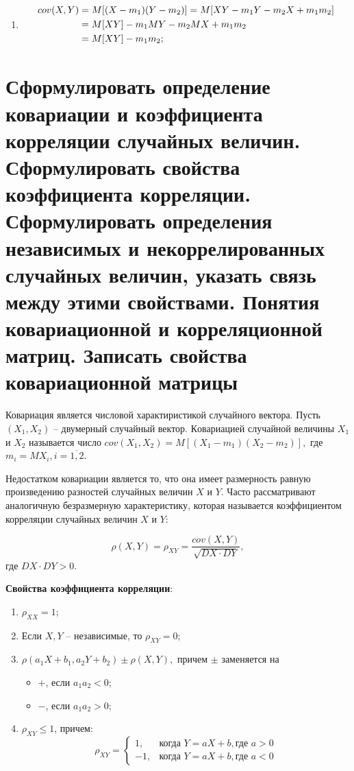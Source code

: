 \begin{enumerate}
	\item
	\begin{align}
		cov(X, Y) &=  M[(X - m_1)(Y-m_2)] = M[XY - m_1Y - m_2X + m_1m_2] \notag \\
		&= M[XY] - m_1MY - m_2MX + m_1m_2 \notag \\
		&= M[XY] - m_1m_2 \notag;
	\end{align}
	
\end{enumerate}

\section{Сформулировать определение ковариации и коэффициента корреляции случайных величин. Сформулировать свойства коэффициента корреляции. Сформулировать определения независимых и некоррелированных случайных величин, указать связь между этими свойствами. Понятия ковариационной и корреляционной матриц. Записать свойства ковариационной матрицы}

Ковариация является числовой характиристикой случайного вектора. Пусть $(X_1, X_2)$ -- двумерный случайный вектор. $Ковариацией$ случайной величины $X_1$ и $X_2$ называется число $cov(X_1, X_2) = M[(X_1 - m_1)(X_2 - m_2)],$ где $m_i = MX_i, i = \overline{1, 2}$.

Недостатком ковариации является то, что она имеет размерность равную произведению разностей случайных величин $X$ и $Y$. Часто рассматривают аналогичную безразмерную характеристику, которая называется коэффициентом корреляции случайных величин $X$ и $Y$:

\[
\rho(X, Y) = \rho_{XY} = \frac{cov(X, Y)}{\sqrt{DX \cdot DY}},
\] 
где $DX \cdot DY > 0$.

\textbf{Свойства коэффициента корреляции}:
\begin{enumerate}
	\item $\rho_{XX} = 1$;
	\item Если $X, Y$ -- независимые, то $\rho_{XY} = 0$;
	\item $\rho(a_1X + b_1, a_2Y + b_2) \pm \rho(X, Y),$ причем $\pm$ заменяется на
	\begin{itemize}
		\item $+$, если $a_1a_2 < 0$;
		\item $-$, если $a_1a_2 > 0$;
	\end{itemize}
	\item $\rho_{XY} \leq 1$, причем:
	\[
	\rho_{XY} =
	\begin{cases} 
		1, & \text{когда } Y = aX + b, \text{где } a > 0 \\
		-1, & \text{когда } Y = aX + b, \text{где } a < 0
	\end{cases}
	\]
\end{enumerate}

